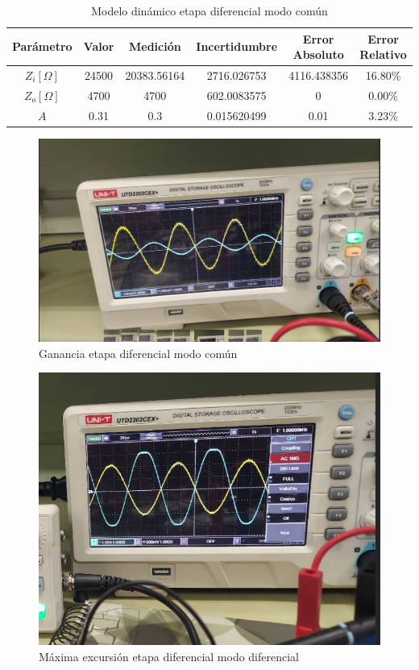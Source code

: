 \begin{table}[h!]
\centering
\begin{tabular}{|c|c|c|c|c|c|}
\hline
\textbf{Parámetro} & \textbf{Valor} & \textbf{Medición} & \textbf{Incertidumbre} & \textbf{Error Absoluto} & \textbf{Error Relativo} \\ \hline
$Z_i [\Omega]$ & 24500 & 20383.56164 & 2716.026753 & 4116.438356 & 16.80\% \\ \hline
$Z_o [\Omega]$ & 4700 & 4700 & 602.0083575 & 0 & 0.00\% \\ \hline
$A$ & 0.31 & 0.3 & 0.015620499 & 0.01 & 3.23\% \\ \hline
\end{tabular}
\caption{Modelo dinámico etapa diferencial modo común}
\label{tab:med-modelo-dinamico-etapa-diferencial-modo-comun}
\end{table}


\begin{figure}[ht]
    \centering
    \includegraphics[width=1.0\textwidth]{src/images/resultados/p2/med-ganancia-mod-comun.png}
    \caption{Ganancia etapa diferencial modo común}
    \label{fig:ganancia-etapa-diff-mod-comun}
\end{figure}

\begin{figure}[ht]
    \centering
    \includegraphics[width=1.0\textwidth]{src/images/resultados/p2/med-maxima-excursion-mod-diff.png}
    \caption{Máxima excursión etapa diferencial modo diferencial}
    \label{fig:max-excursion-mod-diff}
\end{figure}
